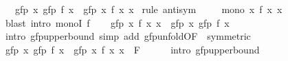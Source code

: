 \begin{isabellebody}
\ \ \ {\isachardoublequoteopen}gfp\ {\isacharparenleft}{\kern0pt}{\isasymlambda}x{\isachardot}{\kern0pt}\ gfp\ {\isacharparenleft}{\kern0pt}f\ x{\isacharparenright}{\kern0pt}{\isacharparenright}{\kern0pt}\ {\isacharequal}{\kern0pt}\ gfp\ {\isacharparenleft}{\kern0pt}{\isasymlambda}x{\isachardot}{\kern0pt}\ f\ x\ x{\isacharparenright}{\kern0pt}{\isachardoublequoteclose}\isanewline
%
\isadelimproof
%
\endisadelimproof
%
\isatagproof
{}\isamarkupfalse%
\ {\isacharparenleft}{\kern0pt}rule\ antisym{\isacharparenright}{\kern0pt}\isanewline
\ \ \isamarkupfalse%
\ {\isacharasterisk}{\kern0pt}{\isacharcolon}{\kern0pt}\ {\isachardoublequoteopen}mono\ {\isacharparenleft}{\kern0pt}{\isasymlambda}x{\isachardot}{\kern0pt}\ f\ x\ x{\isacharparenright}{\kern0pt}{\isachardoublequoteclose}\isanewline
\ \ \ \ \isamarkupfalse%
\ {\isacharparenleft}{\kern0pt}blast\ intro{\isacharcolon}{\kern0pt}\ monoI\ f{\isacharparenright}{\kern0pt}\isanewline
\ \ \isamarkupfalse%
\ {\isachardoublequoteopen}gfp\ {\isacharparenleft}{\kern0pt}{\isasymlambda}x{\isachardot}{\kern0pt}\ f\ x\ x{\isacharparenright}{\kern0pt}\ {\isasymle}\ gfp\ {\isacharparenleft}{\kern0pt}{\isasymlambda}x{\isachardot}{\kern0pt}\ gfp\ {\isacharparenleft}{\kern0pt}f\ x{\isacharparenright}{\kern0pt}{\isacharparenright}{\kern0pt}{\isachardoublequoteclose}\isanewline
\ \ \ \ \isamarkupfalse%
\ {\isacharparenleft}{\kern0pt}intro\ gfp{\isacharunderscore}{\kern0pt}upperbound{\isacharparenright}{\kern0pt}\ {\isacharparenleft}{\kern0pt}simp\ add{\isacharcolon}{\kern0pt}\ gfp{\isacharunderscore}{\kern0pt}unfold{\isacharbrackleft}{\kern0pt}OF\ {\isacharasterisk}{\kern0pt}{\isacharcomma}{\kern0pt}\ symmetric{\isacharbrackright}{\kern0pt}{\isacharparenright}{\kern0pt}\isanewline
\ \ \isamarkupfalse%
\ {\isachardoublequoteopen}gfp\ {\isacharparenleft}{\kern0pt}{\isasymlambda}x{\isachardot}{\kern0pt}\ gfp\ {\isacharparenleft}{\kern0pt}f\ x{\isacharparenright}{\kern0pt}{\isacharparenright}{\kern0pt}\ {\isasymle}\ gfp\ {\isacharparenleft}{\kern0pt}{\isasymlambda}x{\isachardot}{\kern0pt}\ f\ x\ x{\isacharparenright}{\kern0pt}{\isachardoublequoteclose}\ {\isacharparenleft}{\kern0pt}\ {\isachardoublequoteopen}{\isacharquery}{\kern0pt}F\ {\isasymle}\ {\isacharunderscore}{\kern0pt}{\isachardoublequoteclose}{\isacharparenright}{\kern0pt}\isanewline
\ \ \isamarkupfalse%
\ {\isacharparenleft}{\kern0pt}intro\ gfp{\isacharunderscore}{\kern0pt}upperbound{\isacharparenright}{\kern0pt}\isanewline
\ \ \ \ \isamarkupfalse%

\end{isabellebody}
